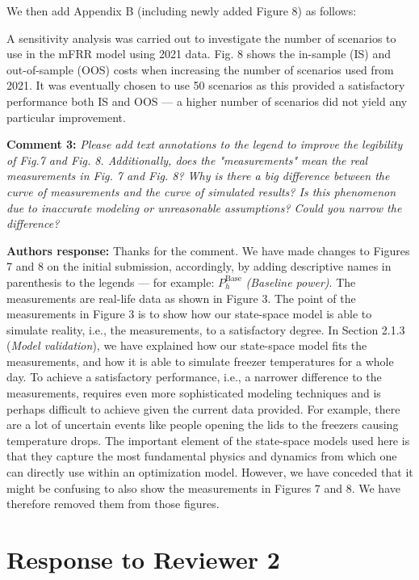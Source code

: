 \documentclass[10pt]{article}
\newcounter{models}
\newcommand{\nt}[1]{\textcolor{newtextcolor}{#1}}
\newcommand{\auth}{\textbf{Authors response: }}
\newcommand{\changes}{\textbf{Changes to the manuscript: }}
\begin{document}
We then add Appendix B (including newly added Figure 8) as follows:

\nt{A sensitivity analysis was carried out to investigate the number of scenarios to use in the mFRR model using  2021 data. Fig. 8 shows the in-sample (IS) and out-of-sample (OOS) costs when increasing the number of scenarios used from 2021. It was eventually chosen to use 50 scenarios as this provided a satisfactory performance both IS and OOS --- a higher number of scenarios did not yield any particular improvement.}


\textbf{Comment 3:} \textit{Please add text annotations to the legend to improve the legibility of Fig.7 and Fig. 8. Additionally, does the "measurements" mean the real measurements in Fig. 7 and Fig. 8? Why is there a big difference between the curve of measurements and the curve of simulated results? Is this phenomenon due to inaccurate modeling or unreasonable assumptions? Could you narrow the difference?}

\auth Thanks for the comment. We have made changes to Figures 7 and 8 on the initial submission, accordingly, by adding descriptive names in parenthesis to the legends --- for example: $P_{h}^{\text{Base}}$ \textit{(Baseline power)}. The measurements are real-life data as shown in Figure 3. The point of the measurements in Figure 3 is to show how our state-space model is able to simulate reality, i.e., the measurements, to a satisfactory degree. In Section 2.1.3 (\textit{Model validation}), we have explained how our state-space model fits the measurements, and how it is able to simulate freezer temperatures for a whole day. To achieve a  satisfactory performance, i.e., a narrower difference to the measurements, requires even more sophisticated modeling techniques and is perhaps difficult to achieve given the current data provided. For example, there are a lot of uncertain events like people opening the lids to the freezers causing temperature drops. The important element of the state-space models used here is that they capture the most fundamental physics and dynamics from which one can directly use within an optimization model. However, we have conceded that it might be confusing to also show the measurements in Figures 7 and 8. We have therefore removed them from those figures.




\newpage
\section{Response to Reviewer 2}
\end{document}
